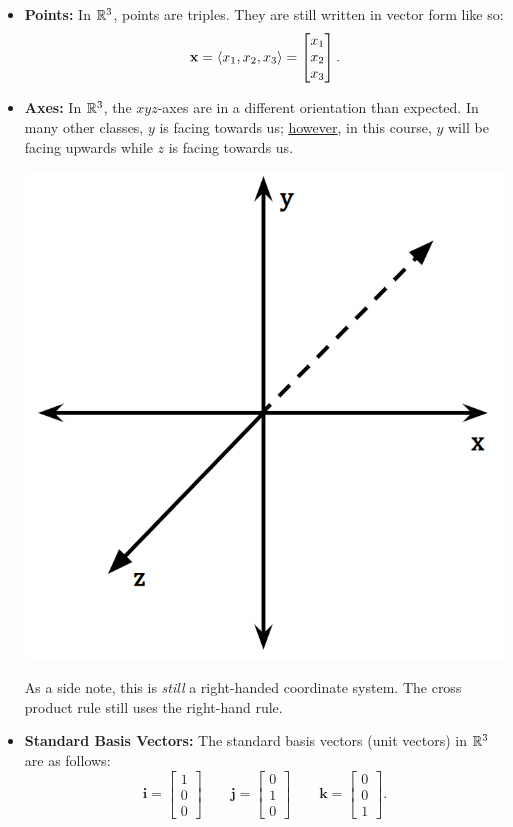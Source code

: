 \documentclass[letterpaper]{article}
\begin{document}
\begin{itemize}
    \item \textbf{Points:} In $\mathbb{R}^3$, points are triples. They are still written in vector form like so: 
    \[\mathbf{x} = \langle x_1, x_2, x_3 \rangle = \begin{bmatrix}
        x_1 \\ x_2 \\ x_3
    \end{bmatrix}.\]

    \item \textbf{Axes:} In $\mathbb{R}^3$, the $xyz$-axes are in a different orientation than expected. In many other classes, $y$ is facing towards us; \underline{however}, in this course, $y$ will be facing upwards while $z$ is facing towards us. 
    \begin{center}
        \includegraphics[scale=0.4]{../assets/axes3d.png}
    \end{center}
    As a side note, this is \emph{still} a right-handed coordinate system. The cross product rule still uses the right-hand rule. 

    \item \textbf{Standard Basis Vectors:} The standard basis vectors (unit vectors) in $\mathbb{R}^3$ are as follows: 
    \[\mathbf{i} = \begin{bmatrix}
        1 \\ 0 \\ 0
    \end{bmatrix} \qquad \mathbf{j} = \begin{bmatrix}
        0 \\ 1 \\ 0
    \end{bmatrix} \qquad \mathbf{k} = \begin{bmatrix}
        0 \\ 0 \\ 1
    \end{bmatrix}.\]
\end{itemize}
\end{document}
